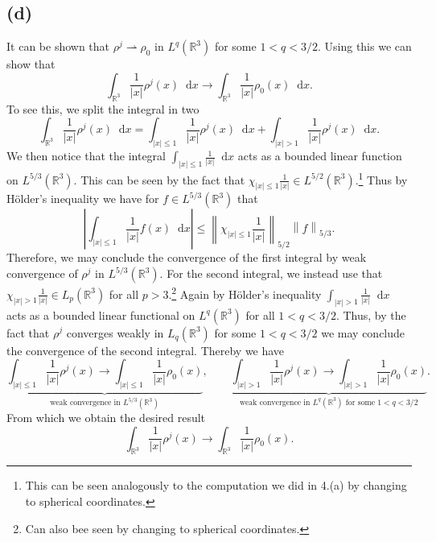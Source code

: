 \documentclass[a4paper,11pt]{article}
\newcommand{\norm}[1]{\left\lVert #1 \right\rVert}
\newcommand{\abs}[1]{\left\lvert #1 \right\rvert}
\newcommand*\diff{\mathop{}\!\mathrm{d}}
\newcommand{\R}{\mathbb{R}}
\numberwithin{equation}{section}
\begin{document}
\subsection*{(d)}
It can be shown that $ \rho^j\rightharpoonup\rho_0 $ in $ L^q(\R^3) $ for some $ 1<q<3/2 $. Using this we can show that \begin{equation}
\int_{\R^3}\frac{1}{\abs{x}}\rho^j(x)\diff x\to\int_{\R^3}\frac{1}{\abs{x}}\rho_0(x)\diff x.
\end{equation}
To see this, we split the integral in two\begin{equation}
\int_{\R^3}\frac{1}{\abs{x}}\rho^j(x)\diff x=\int_{\abs{x}\leq1}\frac{1}{\abs{x}}\rho^j(x)\diff x+\int_{\abs{x}>1}\frac{1}{\abs{x}}\rho^j(x)\diff x.
\end{equation}
We then notice that the integral $ \int_{\abs{x}\leq1}\frac{1}{\abs{x}}\diff x $ acts as a bounded linear function on $ L^{5/3}(\R^3) $. This can be seen by the fact that $ \chi_{\abs{x}\leq1}\frac{1}{\abs{x}}\in L^{5/2}(\R^3) $.\footnote{This can be seen analogously to the computation we did in 4.(a) by changing to spherical coordinates.} Thus by H\"older's inequality we have for $ f\in L^{5/3}(\R^3) $ that\begin{equation}
\abs{\int_{\abs{x}\leq 1}\frac{1}{\abs{x}}f(x)\diff x}\leq\norm{\chi_{\abs{x}\leq1}\frac{1}{\abs{x}}}_{5/2}\norm{f}_{5/3}.
\end{equation}
Therefore, we may conclude the convergence of the first integral by weak convergence of $ \rho^j $ in $ L^{5/3}(\R^3) $. For the second integral, we instead use that $ \chi_{\abs{x}>1}\frac{1}{\abs{x}}\in L_p(\R^3) $ for all $ p>3 $.\footnote{Can also bee seen by changing to spherical coordinates.} Again by H\"older's inequality $ \int_{\abs{x}>1}\frac{1}{\abs{x}}\diff x $ acts as a bounded linear functional on $ L^q(\R^3) $ for all $ 1<q<3/2 $. Thus, by the fact that $ \rho^j $ converges weakly in $ L_q(\R^3) $ for some $ 1<q<3/2 $ we may conclude the convergence of the second integral. Thereby we have \begin{equation}
\underbrace{\int_{\abs{x}\leq1}\frac{1}{\abs{x}}\rho^j(x)\to\int_{\abs{x}\leq1}\frac{1}{\abs{x}}\rho_0(x)}_{\text{weak convergence in }L^{5/3}(\R^3)},\qquad \underbrace{\int_{\abs{x}>1}\frac{1}{\abs{x}}\rho^j(x)\to\int_{\abs{x}>1}\frac{1}{\abs{x}}\rho_0(x)}_{\text{weak convergence in }L^{q}(\R^3)\text{ for some }1<q<3/2}.
\end{equation}
From which we obtain the desired result \begin{equation}
\int_{\R^3}\frac{1}{\abs{x}}\rho^j(x)\to\int_{\R^3}\frac{1}{\abs{x}}\rho_0(x).
\end{equation}
\end{document}
